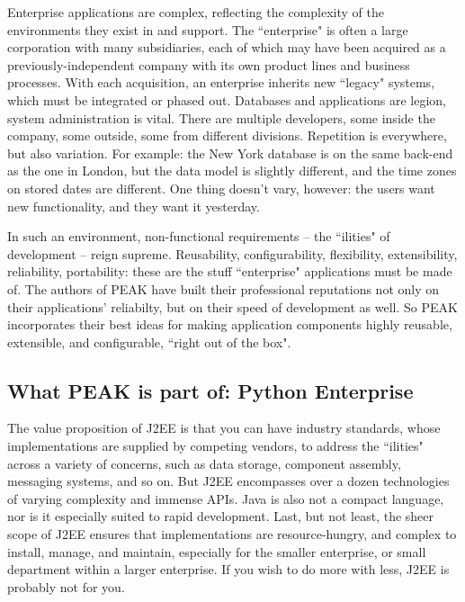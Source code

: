 Enterprise applications are complex, reflecting the complexity of the
environments they exist in and support. The ``enterprise" is often a
large corporation with many subsidiaries, each of which may have been
acquired as a previously-independent company with its own product lines
and business processes. With each acquisition, an enterprise inherits
new ``legacy" systems, which must be integrated or phased out. Databases
and applications are legion, system administration is vital. There are
multiple developers, some inside the company, some outside, some from
different divisions. Repetition is everywhere, but also variation. For
example: the New York database is on the same back-end as the one in
London, but the data model is slightly different, and the time zones on
stored dates are different. One thing doesn't vary, however: the users
want new functionality, and they want it yesterday. 

In such an environment, non-functional requirements -- the ``ilities" of
development -- reign supreme. Reusability, configurability, flexibility,
extensibility, reliability, portability: these are the stuff
``enterprise" applications must be made of. The authors of PEAK have
built their professional reputations not only on their applications'
reliabilty, but on their speed of development as well. So PEAK
incorporates their best ideas for making application components highly
reusable, extensible, and configurable, ``right out of the box". 

















\subsection{What PEAK is part of: Python Enterprise} 

The value proposition of J2EE is that you can have industry standards,
whose implementations are supplied by competing vendors, to address
the ``ilities" across a variety of concerns, such as data storage,
component assembly, messaging systems, and so on.  But J2EE encompasses
over a dozen technologies of varying complexity and immense APIs.  Java
is also not a compact language, nor is it especially suited to rapid
development.  Last, but not least, the sheer scope of J2EE ensures that
implementations are resource-hungry, and complex to install, manage, and
maintain, especially for the smaller enterprise, or small department
within a larger enterprise.  If you wish to do more with less, J2EE is
probably not for you. 

